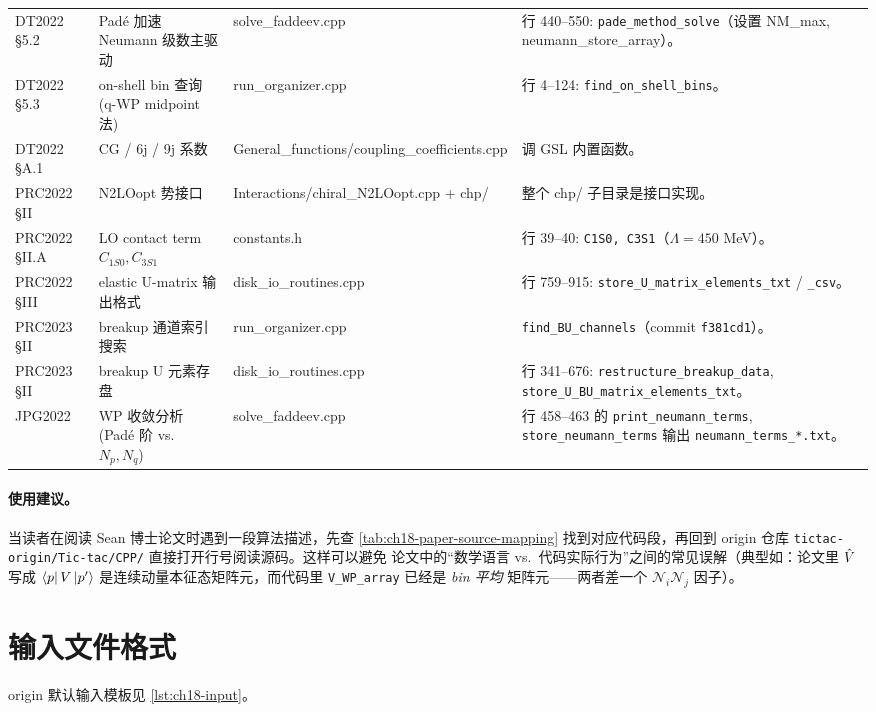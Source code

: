 \begin{longtable}{p{1.7cm}p{4.6cm}p{1.4cm}p{4.4cm}}
DT2022 §5.2 & Padé 加速 Neumann 级数主驱动 & solve\_faddeev.cpp & 行 440--550: \texttt{pade\_method\_solve}（设置 NM\_max, neumann\_store\_array）。\\
DT2022 §5.3 & on-shell bin 查询 (q-WP midpoint 法) & run\_organizer.cpp & 行 4--124: \texttt{find\_on\_shell\_bins}。\\
DT2022 §A.1 & CG / 6j / 9j 系数 & General\_functions/coupling\_coefficients.cpp & 调 GSL 内置函数。\\
PRC2022 §II   & N2LOopt 势接口 & Interactions/chiral\_N2LOopt.cpp + chp/ & 整个 chp/ 子目录是接口实现。\\
PRC2022 §II.A & LO contact term \(C_{1S0}, C_{3S1}\) & constants.h & 行 39--40: \texttt{C1S0, C3S1}（$\Lambda = 450$ MeV）。\\
PRC2022 §III  & elastic U-matrix 输出格式 & disk\_io\_routines.cpp & 行 759--915: \texttt{store\_U\_matrix\_elements\_txt} / \texttt{\_csv}。\\
PRC2023 §II   & breakup 通道索引搜索 & run\_organizer.cpp & \texttt{find\_BU\_channels}（commit \texttt{f381cd1}）。\\
PRC2023 §II   & breakup U 元素存盘 & disk\_io\_routines.cpp & 行 341--676: \texttt{restructure\_breakup\_data}, \texttt{store\_U\_BU\_matrix\_elements\_txt}。\\
JPG2022       & WP 收敛分析 (Padé 阶 vs.~$N_p, N_q$) & solve\_faddeev.cpp & 行 458--463 的 \texttt{print\_neumann\_terms}, \texttt{store\_neumann\_terms} 输出 \texttt{neumann\_terms\_*.txt}。\\
\bottomrule
\end{longtable}

\paragraph{使用建议。}
当读者在阅读 Sean 博士论文时遇到一段算法描述，先查
\cref{tab:ch18-paper-source-mapping} 找到对应代码段，再回到 origin 仓库
\texttt{tictac-origin/Tic-tac/CPP/} 直接打开行号阅读源码。这样可以避免
论文中的“数学语言 vs.\ 代码实际行为”之间的常见误解（典型如：论文里
$\hat{V}$ 写成 \(\bra{p}V\ket{p'}\) 是连续动量本征态矩阵元，而代码里
\texttt{V\_WP\_array} 已经是 \emph{bin 平均} 矩阵元——两者差一个
$\mathcal{N}_i \mathcal{N}_j$ 因子）。

\section{输入文件格式}
\label{sec:ch18-input}

origin 默认输入模板见 \cref{lst:ch18-input}。


